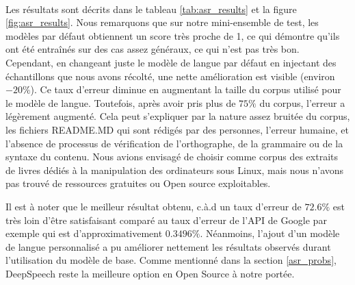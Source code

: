 	\paragraph{}
	Les résultats sont décrits dans le tableau \ref{tab:asr_results} et la figure \ref{fig:asr_results}. Nous remarquons que sur notre mini-ensemble de test, les modèles par défaut obtiennent un score très proche de 1, ce qui démontre qu'ils ont été entraînés sur des cas assez généraux, ce qui n'est pas très bon. Cependant, en changeant juste le modèle de langue par défaut en injectant des échantillons que nous avons récolté, une nette amélioration est visible (environ $-20\%$). Ce taux d'erreur diminue en augmentant la taille du corpus utilisé pour le modèle de langue. Toutefois, après avoir pris plus de $75\%$ du corpus, l'erreur a légèrement augmenté. Cela peut s'expliquer par la nature assez bruitée du corpus, les fichiers README.MD qui sont rédigés par des personnes, l'erreur humaine, et l'absence de processus de vérification de l'orthographe, de la grammaire ou de la syntaxe du contenu. Nous avions envisagé de choisir comme corpus des extraits de livres dédiés à la manipulation des ordinateurs sous Linux, mais nous n'avons pas trouvé de ressources gratuites ou Open source exploitables.
	\par
	Il est à noter que le meilleur résultat obtenu, c.à.d un taux d'erreur de $72.6\%$ est très loin d'être satisfaisant comparé au taux d'erreur de l'API de Google par exemple qui est d'approximativement $0.3496\%$. Néanmoins, l'ajout d'un modèle de langue personnalisé a pu améliorer nettement les résultats observés durant l'utilisation du modèle de base. Comme mentionné dans la section \ref{asr_probs}, DeepSpeech reste la meilleure option en Open Source à notre portée.
